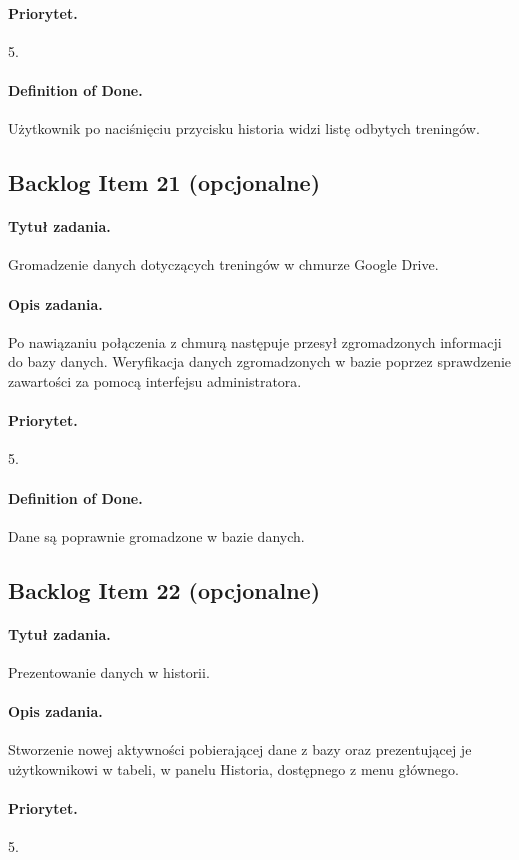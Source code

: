 \documentclass[a4paper]{article}
\begin{document}
\paragraph{Priorytet.} 5.
\paragraph{Definition of Done.} Użytkownik po naciśnięciu przycisku historia widzi listę odbytych treningów.

\subsection{Backlog Item 21 (opcjonalne)}
\paragraph{Tytuł zadania.} Gromadzenie danych dotyczących treningów w chmurze Google Drive.
\paragraph{Opis zadania.} Po nawiązaniu połączenia z chmurą następuje przesył zgromadzonych informacji do bazy danych. Weryfikacja danych zgromadzonych w bazie poprzez sprawdzenie zawartości za pomocą interfejsu administratora.
\paragraph{Priorytet.} 5.
\paragraph{Definition of Done.} Dane są poprawnie gromadzone w bazie danych.

\subsection{Backlog Item 22 (opcjonalne)}
\paragraph{Tytuł zadania.} Prezentowanie danych w historii.
\paragraph{Opis zadania.} Stworzenie nowej aktywności pobierającej dane z bazy oraz prezentującej je użytkownikowi w tabeli, w panelu Historia, dostępnego z menu głównego.
\paragraph{Priorytet.} 5.
\end{document}
